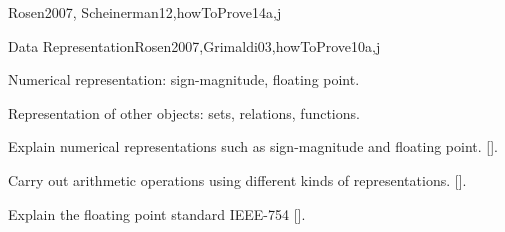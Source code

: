 \begin{syllabus}
\begin{unit}{\DSProofTechniques}{}{Rosen2007, Scheinerman12,howToProve}{14}{a,j}
\begin{topics}
    \item \DSProofTechniquesTopicNotions%
    \item \DSProofTechniquesTopicThe%
    \item \DSProofTechniquesTopicDirect%
    \item \DSProofTechniquesTopicDisproving%
    \item \DSProofTechniquesTopicProof%
    \item \DSProofTechniquesTopicInduction%
    \item \DSProofTechniquesTopicStructural%
    \item \DSProofTechniquesTopicWeak%
    \item \DSProofTechniquesTopicRecursive%
    \item \DSProofTechniquesTopicWell%
\end{topics}

\begin{learningoutcomes}
    \item \DSProofTechniquesLOIdentifyTheUsed [\Assessment]
    \item \DSProofTechniquesLOOutline [\Usage ]
    \item \DSProofTechniquesLOApplyEach [\Usage ]
    \item \DSProofTechniquesLODetermineWhich [\Assessment]
    \item \DSProofTechniquesLOExplainTheIdeas [\Familiarity ]
    \item \DSProofTechniquesLOExplainTheWeak [\Assessment]
    \item \DSProofTechniquesLOStateThe [\Familiarity]
\end{learningoutcomes}
\end{unit}

\begin{unit}{Data Representation}{}{Rosen2007,Grimaldi03,howToProve}{10}{a,j}
\begin{topics}
    \item Numerical representation: sign-magnitude, floating point.
    \item Representation of other objects: sets, relations, functions.
\end{topics}

\begin{learningoutcomes}
    \item Explain numerical representations such as sign-magnitude and floating point. [\Assessment].
    \item Carry out arithmetic operations using different kinds of representations. [\Assessment].
    \item Explain the floating point standard IEEE-754 [\Familiarity].   
\end{learningoutcomes}
\end{unit}

\begin{coursebibliography}
\end{coursebibliography}

\end{syllabus}

%


